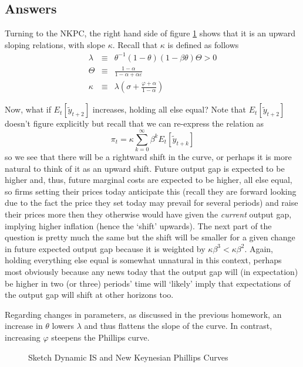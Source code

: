 \documentclass[authoryear,11pt]{elsarticle}
\begin{document}
\subsection*{Answers}
Turning to the NKPC, the right hand side of figure \ref{fig:dis_nkpc} shows that it is an upward sloping relations, with slope $\kappa$. Recall that $\kappa$ is defined as follows
\begin{eqnarray*}
\lambda 			&\equiv& 	\theta^{-1}(1-\theta)(1-\beta\theta)\Theta > 0 \\
\Theta 			&\equiv& 	\frac{1-\alpha}{1-\alpha + \alpha \varepsilon} \\
\kappa			&\equiv&	\lambda \left(\sigma + \frac{\varphi + \alpha}{1-\alpha}  \right)
\end{eqnarray*}

Now, what if $E_{t}[\tilde{y}_{t+2}]$ increases, holding all else equal? Note that $E_{t}[\tilde{y}_{t+2}]$ doesn't figure explicitly but recall that we can re-express the relation as
\[
\pi_{t} = \kappa \sum\limits_{k=0}^{\infty} \beta^{k} E_{t}[ \tilde{y}_{t+k} ]
\]
so we see that there will be a rightward shift in the curve, or perhaps it is more natural to think of it as an upward shift. Future output gap is expected to be higher and, thus, future marginal costs are expected to be higher, all else equal, so firms setting their prices today anticipate this (recall they are forward looking due to the fact the price they set today may prevail for several periods) and raise their prices more then they otherwise would have given the \emph{current} output gap, implying higher inflation (hence the `shift' upwards). The next part of the question is pretty much the same but the shift will be smaller for a given change in future expected output gap because it is weighted by $\kappa \beta^{3} < \kappa \beta^{2}$. Again, holding everything else equal is somewhat unnatural in this context, perhaps most obviously because any news today that the output gap will (in expectation) be higher in two (or three) periods' time will `likely' imply that expectations of the output gap will shift at other horizons too.

Regarding changes in parameters, as discussed in the previous homework, an increase in $\theta$ lowers $\lambda$ and thus flattens the slope of the curve. In contrast, increasing $\varphi$ steepens the Phillips curve.

\begin{figure}[!htb]
\caption{\label{fig:dis_nkpc} Sketch Dynamic IS and New Keynesian Phillips Curves}
\end{figure}
\end{document}

